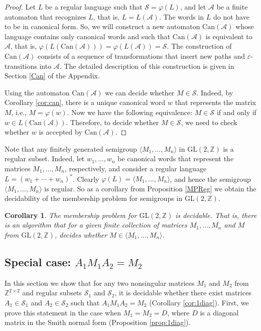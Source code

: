\documentclass[fontsize=11pt,DIV=13,paper=letter]{scrartcl}
\newtheorem{corollary}[theorem]{Corollary}
\theoremstyle{definition}
\newcommand{\la}{\langle}
\newcommand{\ra}{\rangle}
\newcommand{\A}{\mathcal{A}}
\newcommand{\Z}{\mathbb{Z}}
\newcommand{\s}{\mathcal{S}}
\newcommand{\GL}{\mathrm{GL}(2,\Z)}
\renewcommand{\phi}{\varphi}
\renewcommand{\epsilon}{\varepsilon}
\begin{document}
\begin{proof}
Let $L$ be a regular language such that $\s=\phi(L)$, and let $\A$ be a finite automaton that recognizes $L$, that is, $L=L(\A)$. The words in $L$ do not have to be in canonical form. So, we will construct a new automaton $\mathrm{Can}(\A)$ whose language contains only canonical words and such that $\mathrm{Can}(\A)$ is equivalent to $\A$, that is, $\phi(L(\mathrm{Can}(\A)))=\phi(L(\A))=\s$. The construction of $\mathrm{Can}(\A)$ consists of a sequence of transformations that insert new paths and $\epsilon$-transitions into $\A$. The detailed description of this construction is given in Section \ref{Can} of the Appendix.

Using the automaton $\mathrm{Can}(\A)$ we can decide whether $M\in \s$. Indeed, by Corollary \ref{cor:can}, there is a unique canonical word $w$ that represents the matrix $M$, i.e., $M=\phi(w)$. Now we have the following equivalence: $M\in \s$ if and only if $w\in L(\mathrm{Can}(\A))$. Therefore, to decide whether $M\in \s$, we need to check whether $w$ is accepted by $\mathrm{Can}(\A)$.

\end{proof}

Note that any finitely generated semigroup $\la M_1,\dots,M_n\ra$ in $\GL$ is a regular subset. Indeed, let $w_1,\dots,w_n$ be canonical words that represent the matrices $M_1,\dots,M_n$, respectively, and consider a regular language $L={(w_1+\cdots+w_n)}^*$. Clearly $\phi(L)=\la M_1,\dots,M_n\ra$, and hence the semigroup $\la M_1,\dots,M_n\ra$ is regular.
So as a corollary from Proposition \ref{MPReg} we obtain the decidability of the membership problem for semigroups in $\GL$.

\begin{corollary}\label{cor:GL}
The membership problem for $\GL$ is decidable. That is, there is an algorithm that for a given finite collection of matrices $M_1,\dots,M_n$ and $M$ from $\GL$, decides whether $M\in \la M_1,\dots,M_n\ra$.
\end{corollary}

\subsection{Special case: $A_1M_1A_2=M_2$}\label{1mat}

In this section we show that for any two nonsingular matrices $M_1$ and $M_2$ from $\Z^{2\times 2}$ and regular subsets $\s_1$ and $\s_2$, it is decidable whether there exist matrices $A_1\in \s_1$ and $A_2\in \s_2$ such that $A_1M_1A_2=M_2$ (Corollary \ref{cor:1diag}). First, we prove this statement in the case when $M_1=M_2=D$, where $D$ is a diagonal matrix in the Smith normal form (Proposition \ref{prop:1diag}).
\end{document}
